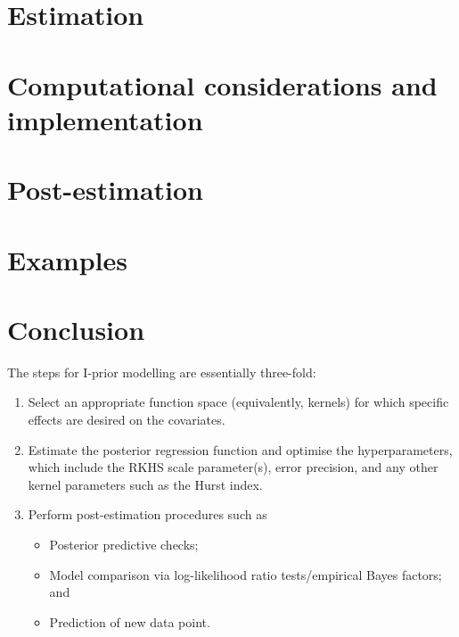 \documentclass[showframe,11pt]{report}
\begin{document}
\section{Estimation}
\label{sec:ipriorestimation}


\section{Computational considerations and implementation}
\label{sec:ipriorcompcons}


\section{Post-estimation}
\label{sec:ipriorpostest}


\section{Examples}\label{sec:ipriorexamples}

\section{Conclusion}

The steps for I-prior modelling are essentially three-fold:
\begin{enumerate}
  \item Select an appropriate function space (equivalently, kernels) for which specific effects are desired on the covariates. 
  \item Estimate the posterior regression function and optimise the hyperparameters, which include the RKHS scale parameter(s), error precision, and any other kernel parameters such as the Hurst index.
  \item Perform post-estimation procedures such as
  \begin{itemize}
    \item Posterior predictive checks;
    \item Model comparison via log-likelihood ratio tests/empirical Bayes factors; and
    \item Prediction of new data point.
  \end{itemize}
\end{enumerate}
\end{document}
